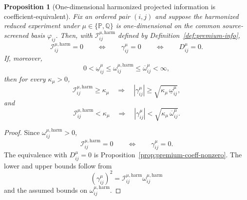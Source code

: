 \documentclass[11pt,a4paper]{amsart}
\theoremstyle{plain}
\newtheorem{proposition}[theorem]{Proposition}
\theoremstyle{definition}
\theoremstyle{remark}
\newcommand{\PP}{\mathbb{P}}
\newcommand{\QQ}{\mathbb{Q}}
\begin{document}
\begin{proposition}[One-dimensional harmonized projected information is coefficient-equivalent]\label{prop:premium-info-equiv}
Fix an ordered pair \((i,j)\) and suppose the harmonized reduced experiment under
\(\mu\in\{\PP,\QQ\}\) is one-dimensional on the common source-screened basis \(\varphi_{ij}\).
Then, with \(\mathcal I_{ij}^{\mu,\mathrm{harm}}\) defined by
Definition~\ref{def:premium-info},
\[
        \mathcal I_{ij}^{\mu,\mathrm{harm}}=0
        \qquad\Longleftrightarrow\qquad
        \gamma_{ij}^\mu=0
        \qquad\Longleftrightarrow\qquad
        D_{ij}^\mu=0.
\]
If, moreover,
\[
        0<\underline\omega_{ij}^\mu
        \le
        \omega_{ij}^{\mu,\mathrm{harm}}
        \le
        \overline\omega_{ij}^\mu
        <\infty,
\]
then for every \(\kappa_\mu>0\),
\[
        \mathcal I_{ij}^{\mu,\mathrm{harm}}\ge \kappa_\mu
        \quad\Longrightarrow\quad
        |\gamma_{ij}^\mu|
        \ge
        \sqrt{\kappa_\mu\,\underline\omega_{ij}^\mu},
\]
and
\[
        \mathcal I_{ij}^{\mu,\mathrm{harm}}< \kappa_\mu
        \quad\Longrightarrow\quad
        |\gamma_{ij}^\mu|
        <
        \sqrt{\kappa_\mu\,\overline\omega_{ij}^\mu}.
\]
\end{proposition}

\begin{proof}
Since \(\omega_{ij}^{\mu,\mathrm{harm}}>0\),
\[
        \mathcal I_{ij}^{\mu,\mathrm{harm}}=0
        \qquad\Longleftrightarrow\qquad
        \gamma_{ij}^\mu=0.
\]
The equivalence with \(D_{ij}^\mu=0\) is Proposition~\ref{prop:premium-coeff-nonzero}.  The lower
and upper bounds follow from
\[
        (\gamma_{ij}^\mu)^2
        =
        \mathcal I_{ij}^{\mu,\mathrm{harm}}
        \omega_{ij}^{\mu,\mathrm{harm}}
\]
and the assumed bounds on \(\omega_{ij}^{\mu,\mathrm{harm}}\).
\end{proof}
\end{document}
